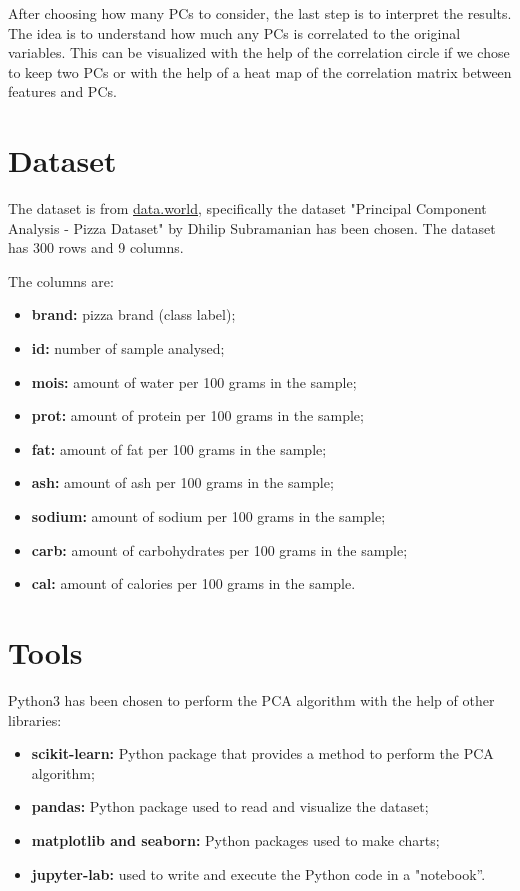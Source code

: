 \documentclass[../main.tex]{subfiles}
\begin{document}
After choosing how many PCs to consider, the last step is to interpret the results. The idea is to understand how much any PCs is correlated to the original variables. This can be visualized with the help of the correlation circle if we chose to keep two PCs or with the help of a heat map of the correlation matrix between features and PCs.

\section{Dataset}
The dataset is from \href{https://data.world}{data.world}, specifically the dataset "Principal Component Analysis - Pizza Dataset" by Dhilip Subramanian has been chosen. The dataset has 300 rows and 9 columns.

The columns are:
\begin{itemize}
    \item \textbf{brand:} pizza brand (class label);
    \item \textbf{id:} number of sample analysed;
    \item \textbf{mois:} amount of water per 100 grams in the sample;
    \item \textbf{prot:} amount of protein per 100 grams in the sample;
    \item \textbf{fat:} amount of fat per 100 grams in the sample;
    \item \textbf{ash:} amount of ash per 100 grams in the sample;
    \item \textbf{sodium:} amount of sodium per 100 grams in the sample;
    \item \textbf{carb:} amount of carbohydrates per 100 grams in the sample;
    \item \textbf{cal:} amount of calories per 100 grams in the sample.
\end{itemize}
\section{Tools}
Python3 has been chosen to perform the PCA algorithm with the help of other libraries:
\begin{itemize}
    \item \textbf{scikit-learn:} Python package that provides a method to perform the PCA algorithm;
    \item \textbf{pandas:} Python package used to read and visualize the dataset;
    \item \textbf{matplotlib and seaborn:} Python packages used to make charts;
    \item \textbf{jupyter-lab:} used to write and execute the Python code in a "notebook''. 
\end{itemize}
\end{document}
